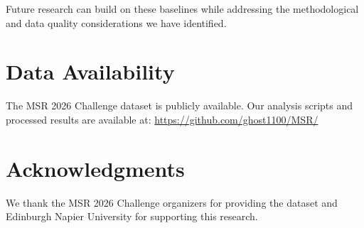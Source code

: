 \documentclass[conference]{IEEEtran}
\begin{document}
Future research can build on these baselines while addressing the methodological and data quality considerations we have identified.

\section*{Data Availability}

The MSR 2026 Challenge dataset is publicly available. Our analysis scripts and processed results are available at: \url{https://github.com/ghost1100/MSR/}

\section*{Acknowledgments}

We thank the MSR 2026 Challenge organizers for providing the dataset and Edinburgh Napier University for supporting this research.
\end{document}
